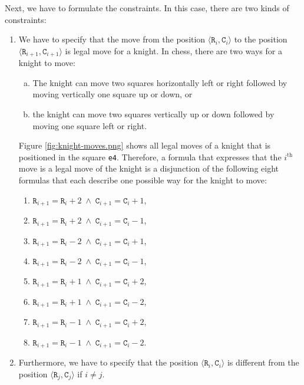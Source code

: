 Next, we have to formulate the constraints.  In this case, there are two kinds of constraints:
\begin{enumerate}
\item We have to specify that the move from the position $\langle \mathtt{R}_i, \mathtt{C}_i \rangle$
      to the position $\langle \mathtt{R}_{i+1}, \mathtt{C}_{i+1} \rangle$ is legal move for a knight.
      In chess, there are two ways for a knight to move:
      \begin{enumerate}[(a)]
      \item The knight can move two squares horizontally left or right followed by moving vertically
            one square up or down, or
      \item the knight can move two squares vertically up or down followed by moving
            one square left or right.
      \end{enumerate}
      Figure \ref{fig:knight-moves.png} shows all legal moves of a knight that is positioned in the square \texttt{e4}.
      Therefore, a formula that expresses that the $i^{\mathrm{th}}$ move is a legal move of the knight is a disjunction
      of the following eight formulas that each describe one possible way for the knight to move:
      \begin{enumerate}
      \item $\mathtt{R}_{i+1} = \mathtt{R}_{i} + 2 \;\wedge\; \mathtt{C}_{i+1} = \mathtt{C}_{i} + 1$,
      \item $\mathtt{R}_{i+1} = \mathtt{R}_{i} + 2 \;\wedge\; \mathtt{C}_{i+1} = \mathtt{C}_{i} - 1$, 
      \item $\mathtt{R}_{i+1} = \mathtt{R}_{i} - 2 \;\wedge\; \mathtt{C}_{i+1} = \mathtt{C}_{i} + 1$, 
      \item $\mathtt{R}_{i+1} = \mathtt{R}_{i} - 2 \;\wedge\; \mathtt{C}_{i+1} = \mathtt{C}_{i} - 1$, 
      \item $\mathtt{R}_{i+1} = \mathtt{R}_{i} + 1 \;\wedge\; \mathtt{C}_{i+1} = \mathtt{C}_{i} + 2$, 
      \item $\mathtt{R}_{i+1} = \mathtt{R}_{i} + 1 \;\wedge\; \mathtt{C}_{i+1} = \mathtt{C}_{i} - 2$, 
      \item $\mathtt{R}_{i+1} = \mathtt{R}_{i} - 1 \;\wedge\; \mathtt{C}_{i+1} = \mathtt{C}_{i} + 2$, 
      \item $\mathtt{R}_{i+1} = \mathtt{R}_{i} - 1 \;\wedge\; \mathtt{C}_{i+1} = \mathtt{C}_{i} - 2$. 
      \end{enumerate}
\item Furthermore, we have to specify that the position  $\langle \mathtt{R}_i, \mathtt{C}_i \rangle$ is
      different from the position  $\langle \mathtt{R}_j, \mathtt{C}_j \rangle$ if $i \not= j$.
\end{enumerate}


